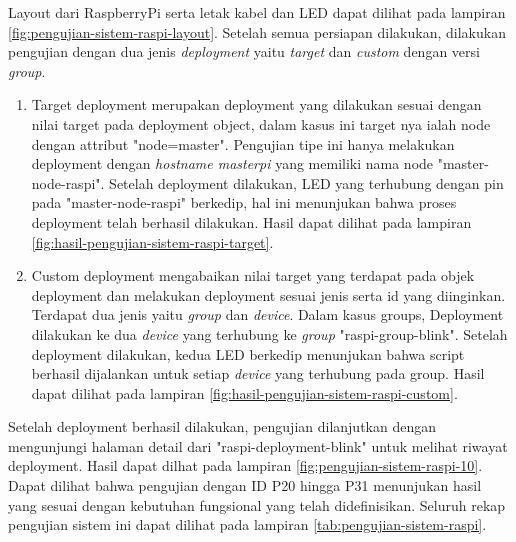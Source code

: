Layout dari RaspberryPi serta letak kabel dan LED dapat dilihat pada lampiran \ref{fig:pengujian-sistem-raspi-layout}. Setelah semua persiapan dilakukan, dilakukan pengujian dengan dua jenis \textit{deployment} yaitu \textit{target} dan \textit{custom} dengan versi \textit{group}.
\begin{enumerate}
    \item Target deployment merupakan deployment yang dilakukan sesuai dengan nilai target pada deployment object, dalam kasus ini target nya ialah node dengan attribut "node=master". Pengujian tipe ini hanya melakukan deployment dengan \textit{hostname masterpi} yang memiliki nama node "master-node-raspi". Setelah deployment dilakukan, LED yang terhubung dengan pin pada "master-node-raspi" berkedip, hal ini menunjukan bahwa proses deployment telah berhasil dilakukan. Hasil dapat dilihat pada lampiran \ref{fig:hasil-pengujian-sistem-raspi-target}.
    \item Custom deployment mengabaikan nilai target yang terdapat pada objek deployment dan melakukan deployment sesuai jenis serta id yang diinginkan. Terdapat dua jenis yaitu \textit{group} dan \textit{device}. Dalam kasus groups, Deployment dilakukan ke dua \textit{device} yang terhubung ke \textit{group} "raspi-group-blink". Setelah deployment dilakukan, kedua LED berkedip menunjukan bahwa script berhasil dijalankan untuk setiap \textit{device} yang terhubung pada group. Hasil dapat dilihat pada lampiran \ref{fig:hasil-pengujian-sistem-raspi-custom}.
\end{enumerate}

Setelah deployment berhasil dilakukan, pengujian dilanjutkan dengan mengunjungi halaman detail dari "raspi-deployment-blink" untuk melihat riwayat deployment. Hasil dapat dilhat pada lampiran \ref{fig:pengujian-sistem-raspi-10}. Dapat dilihat bahwa pengujian dengan ID P20 hingga P31 menunjukan hasil yang sesuai dengan kebutuhan fungsional yang telah didefinisikan. Seluruh rekap pengujian sistem ini dapat dilihat pada lampiran \ref{tab:pengujian-sistem-raspi}.